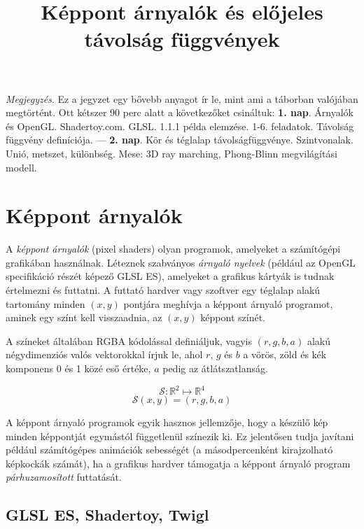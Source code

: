 

\title{Képpont árnyalók és előjeles távolság függvények}


\maketitle

\emph{Megjegyzés}. Ez a jegyzet egy bővebb anyagot ír le, mint ami a táborban valójában megtörtént.
Ott kétszer 90 perc alatt a következőket csináltuk:
\textbf{1. nap}.
Árnyalók és OpenGL. Shadertoy.com. GLSL. 1.1.1 példa elemzése. 1-6. feladatok. Távolság függvény definíciója.
--- \textbf{2. nap}.
Kör és téglalap távolságfüggvénye. Szintvonalak. Unió, metszet, különbség.
Mese: 3D ray marching, Phong-Blinn megvilágítási modell.

\section{Képpont árnyalók}

\begin{tcolorbox}[title=Képpont árnyalók]
A \emph{képpont árnyalók} (pixel shaders) olyan programok, amelyeket a számítógépi grafikában használnak.
Léteznek szabványos \emph{árnyaló nyelvek} (például az OpenGL specifikáció részét képező GLSL ES),
amelyeket a grafikus kártyák
is tudnak értelmezni és futtatni. A futtató hardver vagy szoftver egy téglalap alakú tartomány
minden $(x,y)$ pontjára meghívja a képpont árnyaló programot, aminek egy színt kell visszaadnia,
az $(x,y)$ képpont színét.

A színeket általában RGBA kódolással definiáljuk, vagyis $(r, g, b, a)$ alakú négydimenziós
valós vektorokkal írjuk le, ahol $r$, $g$ és $b$ a vörös, zöld és kék komponens 0 és 1 közé eső
értéke, $a$ pedig az átlátszatlanság.

$$\mathcal{S}: \mathbb{R}^2 \mapsto \mathbb{R}^4$$
$$\mathcal{S}(x, y) = (r, g, b, a)$$
\end{tcolorbox}

A képpont árnyaló programok egyik hasznos jellemzője, hogy a készülő kép minden képpontját
egymástól függetlenül színezik ki. Ez jelentősen tudja javítani például számítógépes animációk
sebességét (a másodpercenként kirajzolható képkockák számát), ha a grafikus hardver támogatja
a képpont árnyaló program \emph{párhuzamosított} futtatását.

\subsection{GLSL ES, Shadertoy, Twigl}


